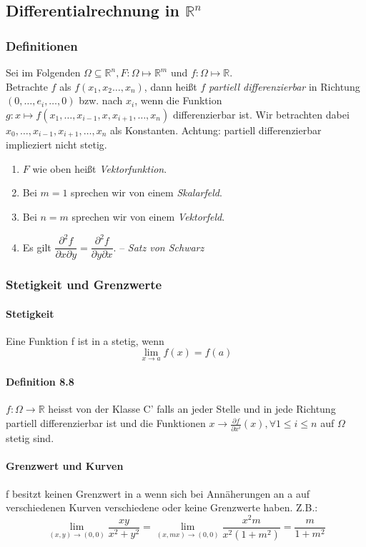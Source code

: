 \documentclass[a4paper, 9pt, DIV=24]{scrartcl}
\newcommand{\R}{\mathbb{R}}
\begin{document}
\clearpage
\subsection{Differentialrechnung in $\mathbb{R}^n$}
\subsubsection{Definitionen}
Sei im Folgenden $\Omega \subseteq \R^n, F: \Omega \mapsto \R^m$ und $f: \Omega \mapsto \R$. \\
Betrachte $f$ als $f(x_1,x_2\dots,x_n)$, dann heißt $f$ \emph{partiell differenzierbar} in Richtung $(0,\dots,e_i,\dots,0)$ bzw. nach $x_i$,
wenn die Funktion $g: x \mapsto f(x_1,\dots,x_{i-1},x,x_{i+1},\dots,x_n)$ differenzierbar ist. Wir betrachten dabei $x_0,\dots,x_{i-1},x_{i+1},\dots,x_n$ als Konstanten. Achtung: partiell differenzierbar implieziert nicht stetig.

\begin{enumerate}[label={(}\arabic*{)}]
 \item $F$ wie oben heißt \emph{Vektorfunktion}.
 \item Bei $m = 1$ sprechen wir von einem \emph{Skalarfeld}.
 \item Bei $n = m$ sprechen wir von einem \emph{Vektorfeld}.
 \item Es gilt $\dfrac{\partial^2 f}{\partial x\partial y} = \dfrac{\partial^2 f}{\partial y\partial x}$. -- \emph{Satz von Schwarz}
\end{enumerate}

\subsubsection{Stetigkeit und Grenzwerte}
\paragraph*{Stetigkeit} Eine Funktion f ist in a stetig, wenn $$\lim_{x\rightarrow a} f(x)=f(a)$$
\paragraph*{Definition 8.8} $f: \Omega \rightarrow \R$ heisst von der Klasse C' falls an jeder Stelle und in jede Richtung partiell differenzierbar ist und die Funktionen $x\rightarrow \frac{\partial f}{\partial x^i}(x), \forall 1\leq i \leq n$ auf $\Omega$ stetig sind.
\paragraph*{Grenzwert und Kurven} f besitzt keinen Grenzwert in a wenn sich bei Annäherungen an a auf verschiedenen Kurven verschiedene oder keine Grenzwerte haben. Z.B.: $$\lim_{(x,y)\rightarrow (0,0)} \frac{xy}{x^2+y^2}=\lim_{(x,mx)\rightarrow (0,0)} \frac{x^2m}{x^2(1+m^2)}=\frac{m}{1+m^2}$$
\end{document}
